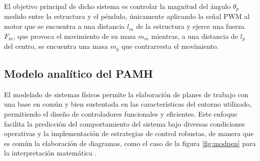 El objetivo principal  de dicho sistema es controlar la magnitud del ángulo $\theta_p$ medido entre la estructura y el péndulo, únicamente aplicando la señal PWM al motor que se encuentra a una distancia $l_m$ de la estructura y ejerce una fuerza $F_m$, que provoca el movimiento de su masa $m_m$ mientras, a una distancia de $l_p$ del centro, se encuentra una masa $m_p$ que contrarresta el movimiento.

\subsection{Modelo analítico del PAMH}

El modelado de sistemas físicos permite la elaboración de planes de trabajo con una base en común y bien sustentada en las características del entorno utilizado, permitiendo el diseño de controladores funcionales y eficientes. Este enfoque facilita la predicción del comportamiento del sistema bajo diversas condiciones operativas y la implementación de estrategias de control robustas, de manera que es común la elaboración de diagramas, como el caso de la figura \ref{fig:modpen} para la interpretación matemática \cite{Nise}.

